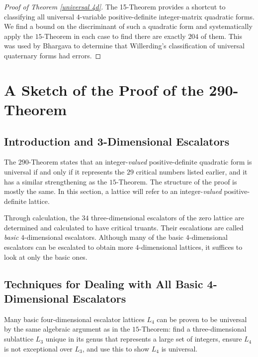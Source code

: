 \documentclass[letterpaper, 12pt]{article}
\begin{document}
\begin{proof}[Proof of Theorem \ref{universal 4d}]
    The 15-Theorem provides a shortcut to classifying all universal $4$-variable positive-definite integer-matrix quadratic forms. We find a bound on the discriminant of such a quadratic form and systematically apply the $15$-Theorem in each case to find there are exactly $204$ of them. This was used by Bhargava to determine that Willerding's classification of universal quaternary forms had errors.
\end{proof}

\section{A Sketch of the Proof of the 290-Theorem}
\subsection{Introduction and 3-Dimensional Escalators}
The $290$-Theorem \cite{twoninety} states that an integer-\emph{valued} positive-definite quadratic form is universal if and only if it represents the $29$ critical numbers listed earlier,
and it has a similar strengthening as the $15$-Theorem.
The structure of the proof is mostly the same.
In this section, a lattice will refer to an integer-\emph{valued} positive-definite lattice.

Through calculation, the $34$ three-dimensional escalators of the zero lattice are determined and calculated to have critical truants.
Their escalations are called \emph{basic} $4$-dimensional escalators. Although many of the basic $4$-dimensional escalators can be escalated to obtain more $4$-dimensional lattices, it suffices to look at only the basic ones.

\subsection{Techniques for Dealing with All Basic 4-Dimensional Escalators}
Many basic four-dimensional escalator lattices $L_4$ can be proven to be universal by the same algebraic argument as in the $15$-Theorem:
find a three-dimensional sublattice $L_3$ unique in its genus that represents a large set of integers, ensure $L_4$ is not exceptional over $L_3$, and use this to show $L_4$ is universal.
\end{document}
